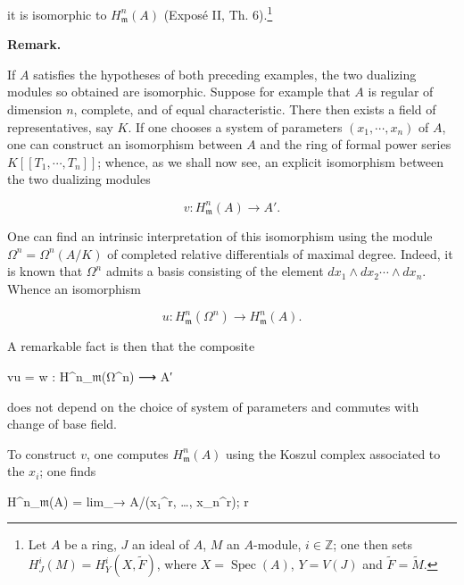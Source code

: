 \documentclass[
]{article}
\newenvironment{Shaded}{}{}
\newcommand{\NormalTok}[1]{#1}
\begin{document}
it is isomorphic to \(H^{n}_{\mathfrak{m}}(A)\) (Exposé II, Th.
6).\footnote{Let \(A\) be a ring, \(J\) an ideal of \(A\), \(M\) an
  \(A\)-module, \(i \in \mathbb{Z}\); one then sets
  \(H^{i}_{J}(M) = H^{i}_{Y}(X, \tilde{F})\), where
  \(X = \operatorname{Spec}(A)\), \(Y = V(J)\) and
  \(\tilde{F} = \tilde{M}\).}

\textbf{Remark.}

If \(A\) satisfies the hypotheses of both preceding examples, the two
dualizing modules so obtained are isomorphic. Suppose for example that
\(A\) is regular of dimension \(n\), complete, and of equal
characteristic. There then exists a field of representatives, say \(K\).
If one chooses a system of parameters \((x_{1}, \cdots, x_{n})\) of
\(A\), one can construct an isomorphism between \(A\) and the ring of
formal power series \(K[[T_{1}, \cdots, T_{n}]]\); whence, as we shall
now see, an explicit isomorphism between the two dualizing modules

\[
v : H^{n}_{\mathfrak{m}}(A) \longrightarrow A'.
\]

One can find an intrinsic interpretation of this isomorphism using the
module \(\Omega^{n} = \Omega^{n}(A/K)\) of completed relative
differentials of maximal degree. Indeed, it is known that \(\Omega^{n}\)
admits a basis consisting of the element
\(dx_{1} \wedge dx_{2} \cdots \wedge dx_{n}\). Whence an isomorphism

\[
u : H^{n}_{\mathfrak{m}}(\Omega^{n}) \longrightarrow H^{n}_{\mathfrak{m}}(A).
\]

A remarkable fact is then that the composite

\begin{Shaded}
\begin{Highlighting}[]
\NormalTok{vu = w : H\^{}n\_𝔪(Ω\^{}n) ⟶ A′}
\end{Highlighting}
\end{Shaded}

does not depend on the choice of system of parameters and commutes with
change of base field.

To construct \(v\), one computes \(H^{n}_{\mathfrak{m}}(A)\) using the
Koszul complex associated to the \(x_{i}\); one finds

\begin{Shaded}
\begin{Highlighting}[]
\NormalTok{H\^{}n\_𝔪(A) = lim\_→ A/(x₁\^{}r, …, x\_n\^{}r);}
\NormalTok{            r}
\end{Highlighting}
\end{Shaded}
\end{document}
